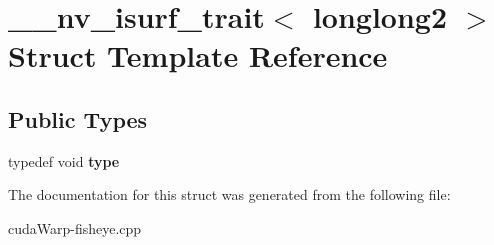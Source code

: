 \hypertarget{struct____nv__isurf__trait_3_01longlong2_01_4}{}\section{\+\_\+\+\_\+nv\+\_\+isurf\+\_\+trait$<$ longlong2 $>$ Struct Template Reference}
\label{struct____nv__isurf__trait_3_01longlong2_01_4}
\subsection*{Public Types}
\begin{DoxyCompactItemize}
\item 
typedef void {\bfseries type}\hypertarget{struct____nv__isurf__trait_3_01longlong2_01_4_a4b9ede08f4e314a28b1868ef9d71c042}{}\label{struct____nv__isurf__trait_3_01longlong2_01_4_a4b9ede08f4e314a28b1868ef9d71c042}

\end{DoxyCompactItemize}


The documentation for this struct was generated from the following file\+:\begin{DoxyCompactItemize}
\item 
cuda\+Warp-\/fisheye.\+cpp\end{DoxyCompactItemize}

